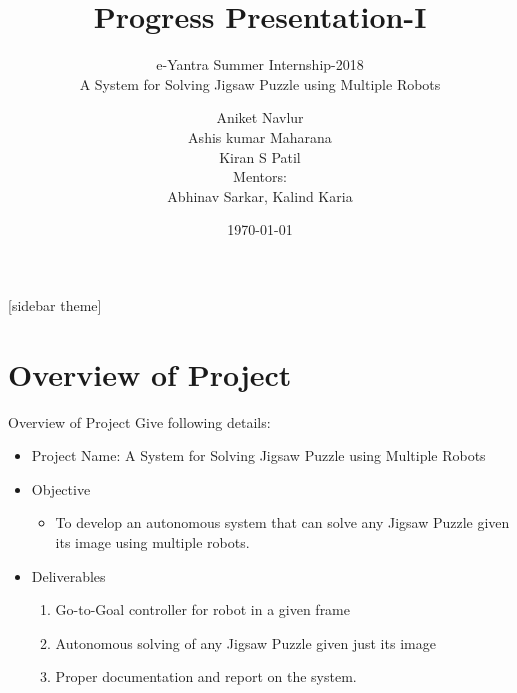 \documentclass[10pt, a4paper]{beamer}
\begin{document}
	\title{Progress Presentation-I}
	\subtitle{e-Yantra Summer Internship-2018 \\ $ $A System for Solving Jigsaw Puzzle using Multiple Robots$ $}
	\author{$ $Aniket Navlur$ $\\$ $Ashis kumar Maharana$ $\\$ $Kiran S Patil$ $\\ \vspace{1em}
	Mentors: \\$ $Abhinav Sarkar, Kalind Karia$ $}
	\date{\today}
	\frame{\titlepage}

[sidebar theme]
\section{Overview of Project}
\begin{frame}{Overview of Project}
	Give following details: \\
	\begin{itemize}
		\item Project Name: A System for Solving Jigsaw Puzzle using Multiple Robots
		\item Objective
		\begin{itemize}
			\item To develop an autonomous system that can solve any Jigsaw Puzzle given its image using multiple robots. 
		\end{itemize}
		\item Deliverables
		\begin{enumerate}
			\item Go-to-Goal controller for robot in a given frame
			\item Autonomous solving of any Jigsaw Puzzle given just its image
			\item Proper documentation and report on the system.
		\end{enumerate}
	\end{itemize}
\end{frame}
\end{document}
